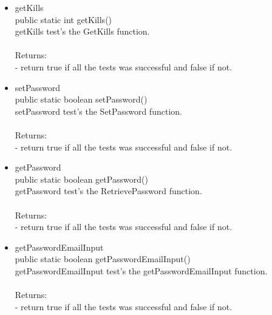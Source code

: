 \documentclass[letterpaper]{article}
\begin{document}
\begin{itemize}
\begin{itemize}
															\item	getKills \\
															  public static int getKills() \\
				
															getKills test's the GetKills function. \\ \\
															Returns: \\
															- return true if all the tests was successful and false if not.
															
															\item	setPassword \\
															 public static boolean setPassword() \\
				
															setPassword test's the SetPassword function. \\ \\
															Returns: \\
															- return true if all the tests was successful and false if not.
															
															\item	getPassword \\
															public static boolean getPassword() \\
				
															 getPassword test's the RetrievePassword function. \\ \\
															Returns: \\
															- return true if all the tests was successful and false if not.
															
															\item	getPasswordEmailInput \\
															 public static boolean getPasswordEmailInput() \\
				
															getPasswordEmailInput test's the getPasswordEmailInput function. \\ \\
															Returns: \\
															- return true if all the tests was successful and false if not.
															
															
												\end{itemize}
									\end{itemize}
						
						\vspace{0.2in}
		
\end{document}
